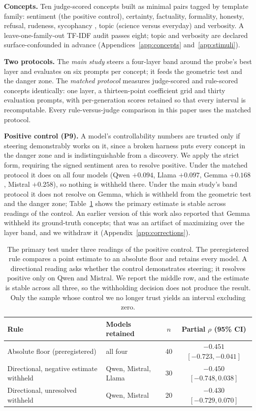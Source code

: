 \documentclass{article}
\begin{document}
\textbf{Concepts.} Ten judge-scored concepts built as minimal pairs tagged by
template family: sentiment (the positive control), certainty, factuality,
formality, honesty, refusal, rudeness, sycophancy \citep{sharma2024sycophancy},
topic (science versus everyday) and verbosity. A leave-one-family-out TF-IDF
audit passes eight; topic and verbosity are declared surface-confounded in
advance (Appendices~\ref{app:concepts} and~\ref{app:stimuli}).

\textbf{Two protocols.} The \emph{main study} steers a four-layer band around the
probe's best layer and evaluates on six prompts per concept; it feeds the
geometric test and the danger zone. The \emph{matched protocol} measures
judge-scored and rule-scored concepts identically: one layer, a thirteen-point
coefficient grid and thirty evaluation prompts, with per-generation scores
retained so that every interval is recomputable. Every rule-versus-judge
comparison in this paper uses the matched protocol.

\label{sec:setup_control}
\textbf{Positive control (P9).} A model's controllability numbers are trusted only
if steering demonstrably works on it, since a broken harness puts every concept
in the danger zone and is indistinguishable from a discovery. We apply the
strict form, requiring the signed sentiment area to resolve positive. Under the
matched protocol it does on all four models (Qwen $+0.094$, Llama $+0.097$,
Gemma $+0.168$, Mistral $+0.258$), so nothing is withheld there. Under the main
study's band protocol it does not resolve on Gemma, which is withheld from the
geometric test and the danger zone; Table~\ref{tab:withhold} shows the primary
estimate is stable across readings of the control. An earlier version of this
work also reported that Gemma withheld its ground-truth concepts; that was an
artifact of maximizing over the layer band, and we withdraw it
(Appendix~\ref{app:corrections}).

\begin{table}[htbp]
  \caption{The primary test under three readings of the positive control. The
  preregistered rule compares a point estimate to an absolute floor and retains
  every model. A directional reading asks whether the control demonstrates
  steering; it resolves positive only on Qwen and Mistral. We report the middle
  row, and the estimate is stable across all three, so the withholding decision
  does not produce the result. Only the sample whose control we no longer trust
  yields an interval excluding zero.}
  \label{tab:withhold}
  \centering
  \footnotesize
  \begin{tabular}{llcc}
    \toprule
    Rule & Models retained & $n$ & Partial $\rho$ (95\% CI) \\
    \midrule
    Absolute floor (preregistered) & all four & 40 & $-0.451$ $[-0.723, -0.041]$ \\
    Directional, negative estimate withheld & Qwen, Mistral, Llama & 30 & $-0.450$ $[-0.748, 0.038]$ \\
    Directional, unresolved withheld & Qwen, Mistral & 20 & $-0.430$ $[-0.729, 0.070]$ \\
    \bottomrule
  \end{tabular}
\end{table}
\end{document}
